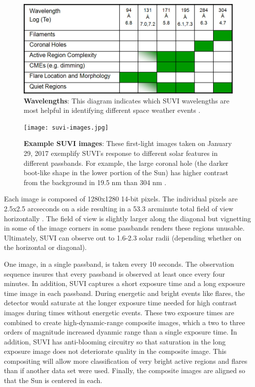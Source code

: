 \documentclass[twoside]{report}
\begin{document}
\begin{figure}[ht]
  \begin{center}
    \includegraphics[scale=0.4]{suvi-wavelength-log.jpg}
    \caption{{\bf Wavelengths}: This diagram indicates which SUVI wavelengths are most helpful in identifying different space weather events \cite{suviwebsite}.}
    \label{fig:suviwavelength}
 \end{center}
\end{figure}


\begin{figure}[ht]
  \begin{center}
    \texttt{[image: suvi-images.jpg]}
    \caption{{\bf Example SUVI images}: These first-light images taken on January 29, 2017 exemplify SUVI's response to different solar features in different passbands. For example, the large coronal hole (the darker boot-like shape in the lower portion of the Sun) has higher contrast from the background in 19.5 nm than 304 nm \cite{suviwebsite}.}
    \label{fig:suviimages}
 \end{center}
\end{figure}


Each image is composed of 1280x1280 14-bit pixels. The individual pixels are 2.5x2.5 arcseconds on a side resulting in a 53.3 arcminute total field of view horizontally \cite{suvibg2}. The field of view is slightly larger along the diagonal but vignetting in some of the image corners in some passbands renders these regions unusable. Ultimately, SUVI can observe out to 1.6-2.3 solar radii (depending whether on the horizontal or diagonal). 

One image, in a single passband, is taken every 10 seconds. The observation sequence insures that every passband is observed at least once every four minutes. In addition, SUVI captures a short exposure time and a long exposure time image in each passband. During energetic and bright events like flares, the detector would saturate at the longer exposure time needed for high contrast images during times without energetic events. These two exposure times are combined to create high-dynamic-range composite images, which a two to three orders of magnitude increased dyanmic range than a single exposure time. In addition, SUVI has anti-blooming circuitry so that saturation in the long exposure image does not deteriorate quality in the composite image. This compositing will allow more classification of very bright active regions and flares than if another data set were used. Finally, the composite images are aligned so that the Sun is centered in each. 
\end{document}
